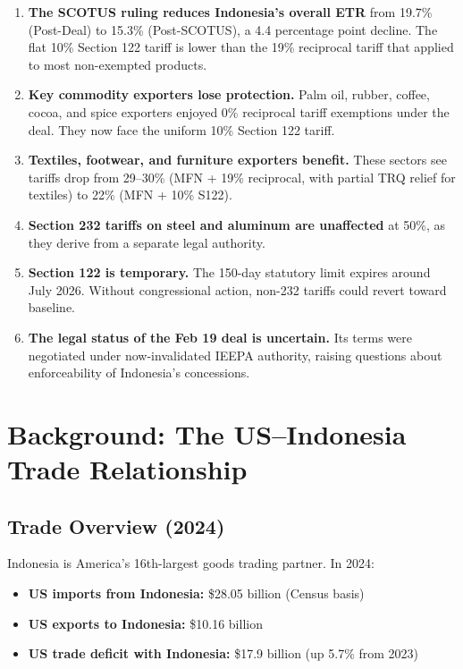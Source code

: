 \documentclass[12pt,a4paper]{article}
\begin{document}
\begin{enumerate}
    \item \textbf{The SCOTUS ruling reduces Indonesia's overall ETR} from 19.7\% (Post-Deal) to 15.3\% (Post-SCOTUS), a 4.4 percentage point decline. The flat 10\% Section 122 tariff is lower than the 19\% reciprocal tariff that applied to most non-exempted products.

    \item \textbf{Key commodity exporters lose protection.} Palm oil, rubber, coffee, cocoa, and spice exporters enjoyed 0\% reciprocal tariff exemptions under the deal. They now face the uniform 10\% Section 122 tariff.

    \item \textbf{Textiles, footwear, and furniture exporters benefit.} These sectors see tariffs drop from 29--30\% (MFN + 19\% reciprocal, with partial TRQ relief for textiles) to 22\% (MFN + 10\% S122).

    \item \textbf{Section 232 tariffs on steel and aluminum are unaffected} at 50\%, as they derive from a separate legal authority.

    \item \textbf{Section 122 is temporary.} The 150-day statutory limit expires around July 2026. Without congressional action, non-232 tariffs could revert toward baseline.

    \item \textbf{The legal status of the Feb 19 deal is uncertain.} Its terms were negotiated under now-invalidated IEEPA authority, raising questions about enforceability of Indonesia's concessions.
\end{enumerate}

\section{Background: The US--Indonesia Trade Relationship}

\subsection{Trade Overview (2024)}

Indonesia is America's 16th-largest goods trading partner. In 2024:

\begin{itemize}
    \item \textbf{US imports from Indonesia:} \$28.05 billion (Census basis)
    \item \textbf{US exports to Indonesia:} \$10.16 billion
    \item \textbf{US trade deficit with Indonesia:} \$17.9 billion (up 5.7\% from 2023)
\end{itemize}
\end{document}
